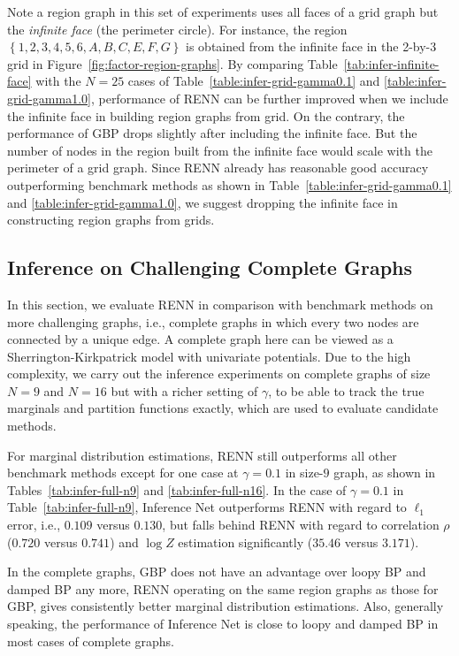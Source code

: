 \sloppy Note a region graph in this set of experiments uses all faces of a grid graph but the \textit{infinite face} (the perimeter circle). For instance, the region $\left\{1, 2, 3, 4, 5, 6, A, B, C ,E, F, G\right\}$ is obtained from the infinite face in the 2-by-3 grid in Figure~\ref{fig:factor-region-graphs}. By comparing Table~\ref{tab:infer-infinite-face} with the $N=25$ cases of Table~\ref{table:infer-grid-gamma0.1} and \ref{table:infer-grid-gamma1.0}, performance of RENN can be further improved when we include the infinite face in building region graphs from grid. On the contrary, the performance of GBP drops slightly after including the infinite face. But the number of nodes in the region built from the infinite face would scale with the perimeter of a grid graph. Since RENN already has reasonable good accuracy outperforming benchmark methods as shown in Table~\ref{table:infer-grid-gamma0.1} and \ref{table:infer-grid-gamma1.0}, we suggest dropping the infinite face in constructing region graphs from grids.


\subsection{Inference on Challenging Complete Graphs}

In this section, we evaluate RENN in comparison with benchmark methods on more challenging graphs, i.e., complete graphs in which every two nodes are connected by a unique edge. A complete graph here can be viewed as a Sherrington-Kirkpatrick model \cite{PhysRevLett.35.1792} with univariate potentials. Due to the high complexity, we carry out the inference experiments on complete graphs of size $N=9$ and $N=16$ but with a richer setting of $\gamma$, to be able to track the true marginals and partition functions exactly, which are used to evaluate candidate methods.

For marginal distribution estimations, RENN still outperforms all other benchmark methods except for one case at $\gamma=0.1$ in size-$9$ graph, as shown in Tables~\ref{tab:infer-full-n9} and \ref{tab:infer-full-n16}. In the case of $\gamma=0.1$ in Table~\ref{tab:infer-full-n9}, Inference Net outperforms RENN with regard to $\ell_1$ error, i.e., $0.109$ versus $0.130$, but falls behind RENN with regard to correlation $\rho$ ($0.720$ versus $0.741$) and $\log{Z}$ estimation significantly ($35.46$ versus $3.171$).

In the complete graphs, GBP does not have an advantage over loopy BP and damped BP any more, RENN operating on the same region graphs as those for GBP, gives consistently better marginal distribution estimations. Also, generally speaking, the performance of Inference Net is close to loopy and damped BP in most cases of complete graphs.

